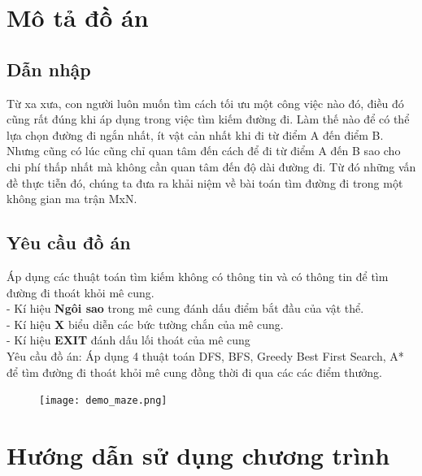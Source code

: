 \documentclass[11pt]{article} %
\begin{document}
\section{Mô tả đồ án}
\subsection{Dẫn nhập}
Từ xa xưa, con người luôn muốn tìm cách tối ưu một công việc nào đó, điều đó cũng rất đúng khi áp dụng trong việc tìm kiếm đường đi. Làm thế nào để có thể lựa chọn đường đi ngắn nhất, ít vật cản nhất khi đi từ điểm A đến điểm B. Nhưng cũng có lúc cũng chỉ quan tâm đến cách để đi từ điểm A đến B sao cho chi phí thấp nhất mà không cần quan tâm đến độ dài đường đi. Từ đó những vấn đề thực tiễn đó, chúng ta đưa ra khải niệm về bài toán tìm đường đi trong một không gian ma trận MxN.
\subsection{Yêu cầu đồ án} \cite{slide}
 Áp dụng các thuật toán tìm kiếm không có thông tin và có thông tin để tìm đường đi thoát khỏi mê cung. 
\\- Kí hiệu \textbf{Ngôi sao} trong mê cung đánh dấu điểm bắt đầu của vật thể. 
\\- Kí hiệu \textbf{X} biểu diễn các bức tường chắn của mê cung.
\\- Kí hiệu \textbf{EXIT} đánh dấu lối thoát của mê cung
\\Yêu cầu đồ án: Áp dụng 4 thuật toán DFS, BFS, Greedy Best First Search, A* để tìm đường đi thoát khỏi mê cung đồng thời đi qua các các điểm thưởng.
\begin{figure}[h] %
	\centering
	\texttt{[image: demo\_maze.png]} %
\end{figure}
\section{Hướng dẫn sử dụng chương trình}
\end{document}
